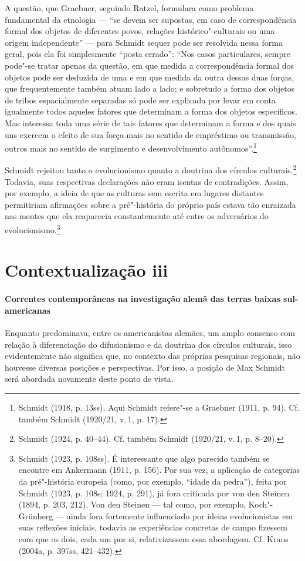 A questão, que Graebner, seguindo Ratzel, formulara como problema
fundamental da etnologia --- ``se devem ser supostas, em caso de
correspondência formal dos objetos de diferentes povos, relações
histórico"-culturais ou uma origem independente'' --- para Schmidt sequer
pode ser resolvida nessa forma geral, pois ela foi simplesmente ``posta
errado'': ``Nos casos particulares, sempre pode"-se tratar apenas da
questão, em que medida a correspondência formal dos objetos pode ser
deduzida de uma e em que medida da outra dessas duas forças, que
frequentemente também atuam lado a lado; e sobretudo a forma dos objetos
de tribos espacialmente separadas só pode ser explicada por levar em
conta igualmente todos aqueles fatores que determinam a forma dos
objetos específicos. Mas interessa toda uma série de tais fatores que
determinam a forma e dos quais uns exercem o efeito de sua força mais no
sentido de empréstimo ou transmissão, outros mais no sentido de
surgimento e desenvolvimento autônomos''.\footnote{Schmidt (1918, p.
  13ss). Aqui Schmidt refere"-se a Graebner (1911, p. 94). Cf. também
  Schmidt (1920/21, v.\,1, p. 17).}

Schmidt rejeitou tanto o evolucionismo quanto a doutrina dos círculos
culturais.\footnote{Schmidt (1924, p. 40--44). Cf. também Schmidt
  (1920/21, v.\,1, p. 8--20).} Todavia, suas respectivas declarações não
eram isentas de contradições. Assim, por exemplo, a ideia de que as
culturas sem escrita em lugares distantes permitiriam afirmações sobre a
pré"-história do próprio país estava tão enraizada nas mentes que ela
reaparecia constantemente até entre os adversários do
evolucionismo.\footnote{Schmidt (1923, p. 108ss). É interessante que
  algo parecido também se encontre em Ankermann (1911, p. 156). Por sua
  vez, a aplicação de categorias da pré"-história europeia (como, por
  exemplo, ``idade da pedra''), feita por Schmidt (1923, p. 108s; 1924,
  p. 291), já fora criticada por von den Steinen (1894, p. 203, 212).
  Von den Steinen --- tal como, por exemplo, Koch"-Grünberg --- ainda fora
  fortemente influenciado por ideias evolucionistas em suas reflexões
  iniciais, todavia as experiências concretas de campo fizessem com que
  os dois, cada um por si, relativizassem essa abordagem. Cf. Kraus
  (2004a, p. 397ss, 421--432).}

\section{Contextualização iii}

\paragraph{Correntes contemporâneas na investigação alemã das terras baixas sul-americanas} Enquanto predominava, entre os americanistas alemães, um amplo consenso
com relação à diferenciação do difusionismo e da doutrina dos círculos
culturais, isso evidentemente não significa que, no contexto das
próprias pesquisas regionais, não houvesse diversas posições e
perspectivas. Por isso, a posição de Max Schmidt será abordada
novamente deste ponto de vista.

